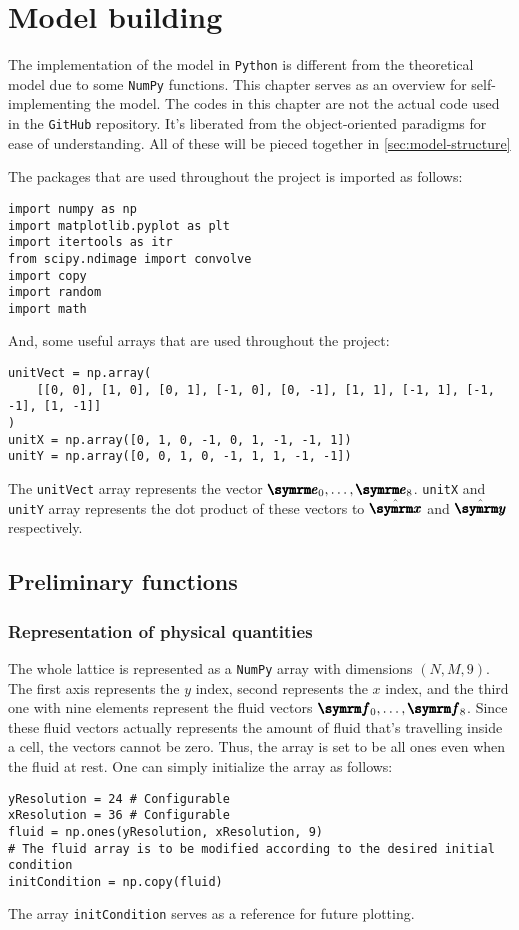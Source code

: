 \chapter{Model building}

The implementation of the model in \texttt{Python} is different from the theoretical model due to some \texttt{NumPy} functions. This chapter serves as an overview for self-implementing the model. The codes in this chapter are not the actual code used in the \texttt{GitHub} repository. It's liberated from the object-oriented paradigms for ease of understanding. All of these will be pieced together in \cref{sec:model-structure}

The packages that are used throughout the project is imported as follows:
\begin{verbatim}
import numpy as np
import matplotlib.pyplot as plt
import itertools as itr
from scipy.ndimage import convolve
import copy
import random
import math
\end{verbatim}
And, some useful arrays that are used throughout the project:
\begin{verbatim}
unitVect = np.array(
    [[0, 0], [1, 0], [0, 1], [-1, 0], [0, -1], [1, 1], [-1, 1], [-1, -1], [1, -1]]
)
unitX = np.array([0, 1, 0, -1, 0, 1, -1, -1, 1])
unitY = np.array([0, 0, 1, 0, -1, 1, 1, -1, -1])
\end{verbatim}
The \texttt{unitVect} array represents the vector $\vv{e}_0,\dots,\vv{e}_8$. \texttt{unitX} and \texttt{unitY} array represents the dot product of these vectors to $\xhat$ and $\yhat$ respectively.

\section{Preliminary functions}

\subsection{Representation of physical quantities}

The whole lattice is represented as a \texttt{NumPy} array with dimensions $(N, M, 9)$. The first axis represents the $y$ index, second represents the $x$ index, and the third one with nine elements represent the fluid vectors $\vv{f}_0, \dots, \vv{f}_8$. Since these fluid vectors actually represents the amount of fluid that's travelling inside a cell, the vectors cannot be zero. Thus, the array is set to be all ones even when the fluid at rest. One can simply initialize the array as follows:
\begin{verbatim}
yResolution = 24 # Configurable
xResolution = 36 # Configurable
fluid = np.ones(yResolution, xResolution, 9)
# The fluid array is to be modified according to the desired initial condition
initCondition = np.copy(fluid)
\end{verbatim}
The array \texttt{initCondition} serves as a reference for future plotting.

